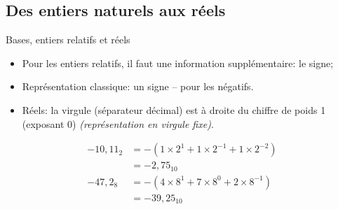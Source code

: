 \subsection{Des entiers naturels aux réels}
\begin{frame}{Bases, entiers relatifs et réels}
  \begin{itemize}
  \item Pour les entiers relatifs, il faut une information
    supplémentaire: le signe;
  \item Représentation classique: un signe -- pour les négatifs.
  \item Réels: la virgule (séparateur décimal) est à droite du chiffre
    de poids 1 (exposant 0) \emph{(représentation en virgule fixe)}.
  \end{itemize}
  \begin{example}
    $$\begin{array}{rl}
      -10,11_{2}&=-\left(1\times2^1+1\times2^{-1}+1\times2^{-2}\right)\\
      &=-2,75_{10}\\
      -47,2_{8}&=-\left(4\times8^1+7\times8^{0}+2\times8^{-1}\right)\\
      &=-39,25_{10}\end{array}$$
  \end{example}
\end{frame}
